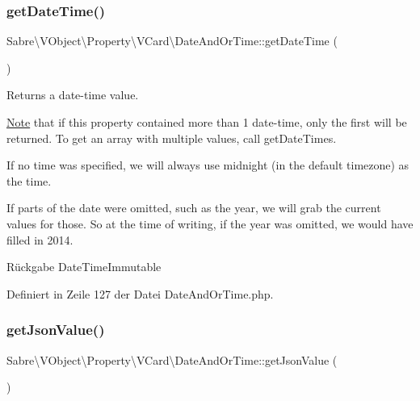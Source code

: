 \subsubsection{\texorpdfstring{get\+Date\+Time()}{getDateTime()}}
{\footnotesize\ttfamily Sabre\textbackslash{}\+V\+Object\textbackslash{}\+Property\textbackslash{}\+V\+Card\textbackslash{}\+Date\+And\+Or\+Time\+::get\+Date\+Time (\begin{DoxyParamCaption}{ }\end{DoxyParamCaption})}

Returns a date-\/time value.

\mbox{\hyperlink{class_note}{Note}} that if this property contained more than 1 date-\/time, only the first will be returned. To get an array with multiple values, call get\+Date\+Times.

If no time was specified, we will always use midnight (in the default timezone) as the time.

If parts of the date were omitted, such as the year, we will grab the current values for those. So at the time of writing, if the year was omitted, we would have filled in 2014.

\begin{DoxyReturn}{Rückgabe}
Date\+Time\+Immutable 
\end{DoxyReturn}


Definiert in Zeile 127 der Datei Date\+And\+Or\+Time.\+php.

\mbox{\label{class_sabre_1_1_v_object_1_1_property_1_1_v_card_1_1_date_and_or_time_a2483cedf4855c2e116e31086af84a7d0}} 
\subsubsection{\texorpdfstring{get\+Json\+Value()}{getJsonValue()}}
{\footnotesize\ttfamily Sabre\textbackslash{}\+V\+Object\textbackslash{}\+Property\textbackslash{}\+V\+Card\textbackslash{}\+Date\+And\+Or\+Time\+::get\+Json\+Value (\begin{DoxyParamCaption}{ }\end{DoxyParamCaption})}

